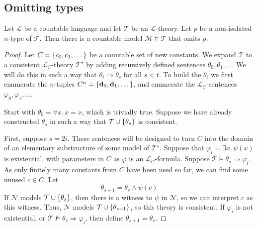 \subsection{Omitting types}
\begin{theorem}
    Let \( \mathcal L \) be a countable language and let \( \mathcal T \) be an \( \mathcal L \)-theory.
    Let \( p \) be a non-isolated \( n \)-type of \( \mathcal T \).
    Then there is a countable model \( \mathcal M \vDash \mathcal T \) that omits \( p \).
\end{theorem}
\begin{proof}
    Let \( C = \qty{c_0, c_1, \dots} \) be a countable set of new constants.
    We expand \( \mathcal T \) to a consistent \( \mathcal L_C \)-theory \( \mathcal T^\star \) by adding recursively defined sentences \( \theta_0, \theta_1, \dots \).
    We will do this in such a way that \( \theta_t \Rightarrow \theta_s \) for all \( s < t \).
    To build the \( \theta \), we first enumerate the \( n \)-tuples \( C^n = \qty{\vb d_0, \vb d_1, \dots} \), and enumerate the \( \mathcal L_C \)-sentences \( \varphi_0, \varphi_1, \dots \).

    Start with \( \theta_0 = \forall x.\, x = x \), which is trivially true.
    Suppose we have already constructed \( \theta_s \) in such a way that \( \mathcal T \cup \qty{\theta_s} \) is consistent.

    First, suppose \( s = 2i \).
    These sentences will be designed to turn \( C \) into the domain of an elementary substructure of some model of \( \mathcal T^\star \).
    Suppose that \( \varphi_i = \exists x.\, \psi(x) \) is existential, with parameters in \( C \) as \( \varphi \) is an \( \mathcal L_C \)-formula.
    Suppose \( \mathcal T \vDash \theta_s \Rightarrow \varphi_i \).
    As only finitely many constants from \( C \) have been used so far, we can find some unused \( c \in C \).
    Let
    \[ \theta_{s + 1} = \theta_s \wedge \psi(c) \]
    If \( \mathcal N \) models \( \mathcal T \cup \qty{\theta_s} \), then there is a witness to \( \psi \) in \( \mathcal N \), so we can interpret \( c \) as this witness.
    Thus, \( \mathcal N \) models \( \mathcal T \cup \qty{\theta_{s+1}} \), so this theory is consistent.
    If \( \varphi_i \) is not existential, or \( \mathcal T \nvDash \theta_s \Rightarrow \varphi_i \), then define \( \theta_{s + 1} = \theta_s \).


\end{proof}
